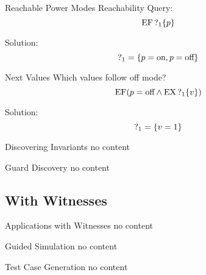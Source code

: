 \begin{frame}{Reachable Power Modes}
  Reachability Query:
  \[\operatorname{EF} \operatorname{?}_1\{p\}\]
  
  \pause
  
  Solution:
  \[\operatorname{?}_1 = \{p = \text{on}, p = \text{off}\}\]
\end{frame}

\begin{frame}{Next Values}
  Which values follow off mode?
  \[\operatorname{EF} (p = \text{off} \land \operatorname{EX}\operatorname{?}_1\{v\})\]
  
  \pause
  
  Solution:
  \[\operatorname{?}_1 = \{v = 1\}\]
\end{frame}

\begin{frame}{Discovering Invariants}
  no content
\end{frame}

\begin{frame}{Guard Discovery}
  no content
\end{frame}

\subsection{With Witnesses} 

\begin{frame}{Applications with Witnesses}
  no content
\end{frame}

\begin{frame}{Guided Simulation}
  no content
\end{frame}

\begin{frame}{Test Case Generation}
  no content
\end{frame}
